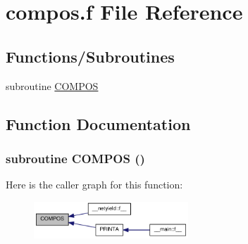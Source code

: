 \hypertarget{compos_8f}{
\section{compos.f File Reference}
\label{compos_8f}
}
\subsection*{Functions/Subroutines}
\begin{DoxyCompactItemize}
\item 
subroutine \hyperlink{compos_8f_a68da311c3943909b70fecb6abbd60386}{COMPOS}
\end{DoxyCompactItemize}


\subsection{Function Documentation}
\hypertarget{compos_8f_a68da311c3943909b70fecb6abbd60386}{
\subsubsection[{COMPOS}]{\setlength{\rightskip}{0pt plus 5cm}subroutine COMPOS ()}}
\label{compos_8f_a68da311c3943909b70fecb6abbd60386}


Here is the caller graph for this function:\nopagebreak
\begin{figure}[H]
\begin{center}
\leavevmode
\includegraphics[width=164pt]{compos_8f_a68da311c3943909b70fecb6abbd60386_icgraph}
\end{center}
\end{figure}

